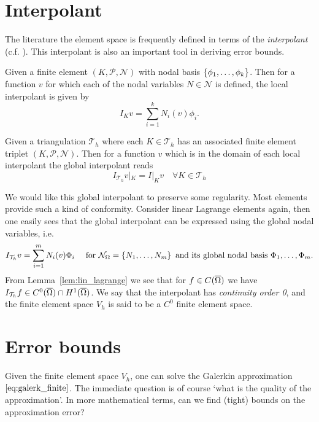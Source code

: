 \documentclass[thesis.tex]{subfiles}
\begin{document}
\section{Interpolant}
\label{sec:apriori}
The literature the element space is frequently defined in terms of the \emph{interpolant} (c.f. \cite[Ch~3]{brenner}). This interpolant is also
  an important tool in deriving error bounds. 
  \begin{defn}
    Given a finite element $(K, \mathcal{P}, \mathcal{N})$ with nodal basis $\set{\phi_1,\dots, \phi_k}$. Then for a function $v$ for which each of the nodal variables $N \in \mathcal{N}$ is defined, the local interpolant is given by
    \[
      I_K v = \sum_{i = 1}^k N_i(v)\phi_i.
    \]
  \end{defn}
  \begin{defn}
    Given a triangulation $\mathcal{T}_h$ where each $K \in \mathcal{T}_h$ has an associated finite element triplet $(K, \mathcal{P}, \mathcal{N})$. Then for
    a function $v$ which is in the domain of each local interpolant the global interpolant reads
    \[
      I_{\mathcal{T}_h} v |_K = I|_K v \quad \forall K \in \mathcal{T}_h
    \]
  \end{defn}
  We would like this global interpolant to preserve some regularity. Most elements provide such a kind of conformity. Consider
  linear Lagrange elements again, then one easily sees that the global interpolant can be expressed using the global nodal variables, i.e.
    \[
      I_{\mathcal{T}_h} v = \sum_{i=1}^m N_i(v)\Phi_i \quad \text{ for } \mathcal{N}_\Omega =\set{N_1, \dots, N_m} \text{ and its global nodal basis } \Phi_1,\dots,\Phi_m.
    \]
    From Lemma~\ref{lem:lin_lagrange} we see that for $f \in C(\overline{\Omega})$ we have $I_{\mathcal{T}_h} f \in C^0(\overline{\Omega}) \cap H^1(\overline{\Omega})$. We say
    that the interpolant has \emph{continuity order 0}, and the finite element space $V_h$ is said to be a $C^0$ finite element space.
  \section{Error bounds}
  Given the finite element space $V_h$, one can solve the Galerkin approximation $\eqref{eq:galerk_finite}$. The immediate
  question is of course `what is the quality of the approximation'. In more mathematical terms, can we find (tight) bounds
  on the approximation error?
\end{document}
